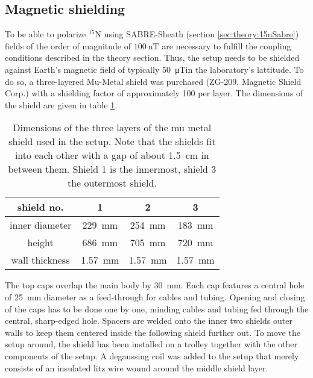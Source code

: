         \subsection{Magnetic shielding}
        To be able to polarize $^{15}\mathrm{N}$ using SABRE-Sheath (section \ref{sec:theory:15nSabre}) fields of the order of magnitude of $\SI{100}{\nano\tesla}$ are necessary to fulfill the coupling conditions described in the theory section. Thus, the setup needs to be shielded against Earth's magnetic field of typically \SI{50}{\micro\tesla}in the laboratory's lattitude. To do so, a three-layered Mu-Metal shield was purchased (ZG-209, Magnetic Shield Corp.) with a shielding factor of approximately 100 per layer. The dimensions of the shield are given in table \ref{table:matMeth:muMetalDims}.
            \begin{table}
                \centering
                \begin{tabular}{|c|ccc|}
                    \hline
                    shield no. & 1 & 2 & 3 \\
                    \hline
                    inner diameter &  \SI{229}{\mm}& \SI{254}{\mm}& \SI{183}{\mm}\\
                    height & \SI{686}{\mm}& \SI{705}{\mm}& \SI{720}\mm\\
                    wall thickness&\SI{1.57}{\mm}&\SI{1.57}{\mm}&\SI{1.57}{\mm}\\
                    \hline
                \end{tabular}
                \caption[Shield dimensions]{Dimensions of the three layers of the mu metal shield used in the setup. Note that the shields fit into each other with a gap of about \SI{1.5}{\cm} in between them. Shield 1 is the innermost, shield 3 the outermost shield.}
                \label{table:matMeth:muMetalDims}
            \end{table}
            The top caps overlap the main body by \SI{30}{\mm}.  Each cap features a central hole of \SI{25}{\mm} diameter as a feed-through for cables and tubing. Opening and closing of the caps has to be done one by one, minding cables and tubing fed through the central, sharp-edged hole. Spacers are welded onto the inner two shields outer walls to keep them centered inside the following shield further out. To move the setup around, the shield has been installed on a trolley together with the other components of the setup.  A degaussing coil was  added to the setup that merely consists of an insulated litz wire wound around the middle shield layer.
